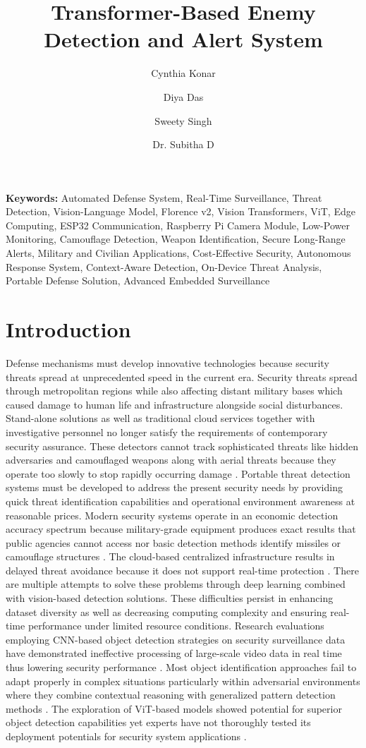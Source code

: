 \documentclass[fleqn,10pt,lineno]{wlpeerj}
\title{Transformer-Based Enemy Detection and Alert System}
\author[1]{Cynthia Konar}
\author[2]{Diya Das}
\author[3]{Sweety Singh}
\author[4]{Dr. Subitha D}
\affil[1,2]{B.Tech CSE, Vellore Institute of Technology, Chennai, India}
\affil[3]{B.Tech CSE with CPS, Vellore Institute of Technology, Chennai, India}
\affil[4]{Assistant Professor Senior Grade 2, Vellore Institute of Technology, Chennai, India}
\begin{document}
\flushbottom
\maketitle
\thispagestyle{empty}

\noindent \textbf{Keywords:} Automated Defense System, Real-Time Surveillance, Threat Detection, Vision-Language Model, Florence v2, Vision Transformers, ViT, Edge Computing, ESP32 Communication, Raspberry Pi Camera Module, Low-Power Monitoring, Camouflage Detection, Weapon Identification, Secure Long-Range Alerts, Military and Civilian Applications, Cost-Effective Security, Autonomous Response System, Context-Aware Detection, On-Device Threat Analysis, Portable Defense Solution, Advanced Embedded Surveillance

\section*{Introduction}
Defense mechanisms must develop innovative technologies because security threats spread at unprecedented speed in the current era. Security threats spread through metropolitan regions while also affecting distant military bases which caused damage to human life and infrastructure alongside social disturbances. Stand-alone solutions as well as traditional cloud services together with investigative personnel no longer satisfy the requirements of contemporary security assurance. These detectors cannot track sophisticated threats like hidden adversaries and camouflaged weapons along with aerial threats because they operate too slowly to stop rapidly occurring damage \cite{1}.
Portable threat detection systems must be developed to address the present security needs by providing quick threat identification capabilities and operational environment awareness at reasonable prices. Modern security systems operate in an economic detection accuracy spectrum because military-grade equipment produces exact results that public agencies cannot access nor basic detection methods identify missiles or camouflage structures \cite{2}. The cloud-based centralized infrastructure results in delayed threat avoidance because it does not support real-time protection \cite{3}.
There are multiple attempts to solve these problems through deep learning combined with vision-based detection solutions. These difficulties persist in enhancing dataset diversity as well as decreasing computing complexity and ensuring real-time performance under limited resource conditions. Research evaluations employing CNN-based object detection strategies on security surveillance data have demonstrated ineffective processing of large-scale video data in real time thus lowering security performance \cite{4}. Most object identification approaches fail to adapt properly in complex situations particularly within adversarial environments where they combine contextual reasoning with generalized pattern detection methods \cite{5}. The exploration of ViT-based models showed potential for superior object detection capabilities yet experts have not thoroughly tested its deployment potentials for security system applications \cite{2}. 
\end{document}
